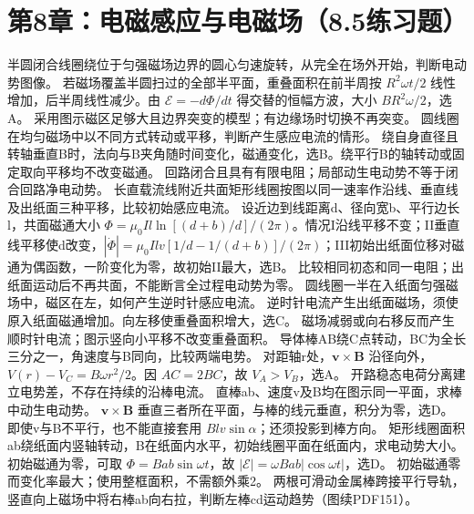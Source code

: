 \section{第8章：电磁感应与电磁场（8.5练习题）}
\problemtext 半圆闭合线圈绕位于匀强磁场边界的圆心匀速旋转，从完全在场外开始，判断电动势图像。
\workings 若磁场覆盖半圆扫过的全部半平面，重叠面积在前半周按 $R^2\omega t/2$ 线性增加，后半周线性减少。由 $\mathcal E=-d\Phi/dt$ 得交替的恒幅方波，大小 $B R^2\omega/2$，选A。
\crosscheck 采用图示磁区足够大且边界突变的模型；有边缘场时切换不再突变。
\problemtext 圆线圈在均匀磁场中以不同方式转动或平移，判断产生感应电流的情形。
\workings 绕自身直径且转轴垂直B时，法向与B夹角随时间变化，磁通变化，选B。绕平行B的轴转动或固定取向平移均不改变磁通。
\crosscheck 回路闭合且具有有限电阻；局部动生电动势不等于闭合回路净电动势。
\problemtext 长直载流线附近共面矩形线圈按图以同一速率作沿线、垂直线及出纸面三种平移，比较初始感应电流。
\workings 设近边到线距离d、径向宽b、平行边长l，共面磁通大小 $\Phi=\mu_0Il\ln[(d+b)/d]/(2\pi)$。情况I沿线平移不变；II垂直线平移使d改变，$|\dot\Phi|=\mu_0Ilv[1/d-1/(d+b)]/(2\pi)$；III初始出纸面位移对磁通为偶函数，一阶变化为零，故初始II最大，选B。
\crosscheck 比较相同初态和同一电阻；出纸面运动后不再共面，不能断言全过程电动势为零。
\problemtext 圆线圈一半在入纸面匀强磁场中，磁区在左，如何产生逆时针感应电流。
\workings 逆时针电流产生出纸面磁场，须使原入纸面磁通增加。向左移使重叠面积增大，选C。
\crosscheck 磁场减弱或向右移反而产生顺时针电流；图示竖向小平移不改变重叠面积。
\problemtext 导体棒AB绕C点转动，BC为全长三分之一，角速度与B同向，比较两端电势。
\workings 对距轴r处，$\bm v\times\bm B$ 沿径向外，$V(r)-V_C=B\omega r^2/2$。因 $AC=2BC$，故 $V_A>V_B$，选A。
\crosscheck 开路稳态电荷分离建立电势差，不存在持续的沿棒电流。
\problemtext 直棒ab、速度v及B均在图示同一平面，求棒中动生电动势。
\workings $\bm v\times\bm B$ 垂直三者所在平面，与棒的线元垂直，积分为零，选D。
\crosscheck 即使v与B不平行，也不能直接套用 $Blv\sin\alpha$；还须投影到棒方向。
\problemtext 矩形线圈面积ab绕纸面内竖轴转动，B在纸面内水平，初始线圈平面在纸面内，求电动势大小。
\workings 初始磁通为零，可取 $\Phi=Bab\sin\omega t$，故 $|\mathcal E|=\omega Bab|\cos\omega t|$，选D。
\crosscheck 初始磁通零而变化率最大；使用整框面积，不需额外乘2。
\problemtext 两根可滑动金属棒跨接平行导轨，竖直向上磁场中将右棒ab向右拉，判断左棒cd运动趋势（图续PDF151）。
